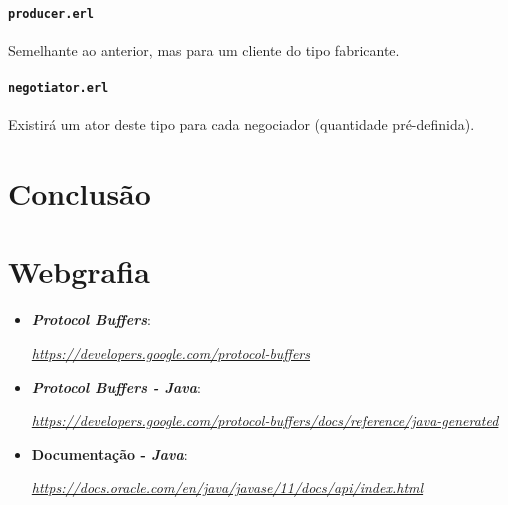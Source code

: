 \documentclass[a4paper]{report}
\begin{document}
	\subsubsection{\texttt{producer.erl}}
	Semelhante ao anterior, mas para um cliente do tipo fabricante.

	\subsubsection{\texttt{negotiator.erl}}
	Existirá um ator deste tipo para cada negociador (quantidade pré-definida).

\chapter{Conclusão}

\chapter{Webgrafia}
	\begin{itemize}
		\item \textbf{\textit{Protocol Buffers}}:
		\par \textit{\url{https://developers.google.com/protocol-buffers}}
        \item \textbf{\textit{Protocol Buffers - Java}}:
		\par \textit{\url{https://developers.google.com/protocol-buffers/docs/reference/java-generated}}
		\item \textbf{Documentação - \textit{Java}}:
		\par \textit{\url{https://docs.oracle.com/en/java/javase/11/docs/api/index.html}}
    \end{itemize}
\end{document}
